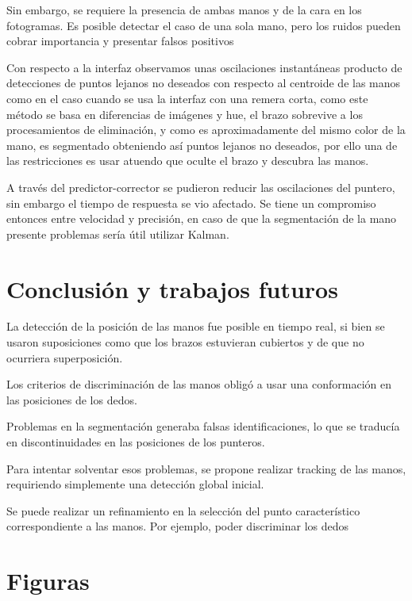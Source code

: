 \documentclass[conference,a4paper,10pt,oneside,final]{tfmpd}
\begin{document}
	Sin embargo, se requiere la presencia de ambas manos y de la cara en los fotogramas. Es posible detectar el caso de una sola mano, pero los ruidos pueden cobrar importancia y presentar falsos positivos

		Con respecto a la interfaz observamos unas oscilaciones instantáneas producto de detecciones de puntos lejanos no deseados con respecto al centroide de las manos como en el caso cuando se usa la interfaz con una remera corta, como este método se basa en diferencias de imágenes y hue, el brazo sobrevive a los procesamientos  de eliminación, y como es aproximadamente del mismo color de la mano, es segmentado obteniendo así puntos lejanos no deseados, por ello una de las restricciones es usar  atuendo que oculte el brazo y descubra las manos.

		A través del predictor-corrector se pudieron reducir las oscilaciones del puntero, 
	sin embargo el tiempo de respuesta se vio afectado. 
	Se tiene un compromiso entonces entre velocidad y precisión, en caso de que la segmentación de la mano
	presente problemas sería útil utilizar Kalman.

	\section{Conclusión y trabajos futuros}
		La detección de la posición de las manos fue posible en tiempo real,
		si bien se usaron suposiciones como que los brazos estuvieran cubiertos
		y de que no ocurriera superposición.

		Los criterios de discriminación de las manos obligó a 
		usar una conformación en las posiciones de los dedos. 

		Problemas en la segmentación generaba falsas identificaciones, 
		lo que se traducía en discontinuidades en las posiciones de los punteros.

		Para intentar solventar esos problemas, se propone realizar tracking
		de las manos, requiriendo simplemente una detección global inicial.

		Se puede realizar un refinamiento en la selección del punto característico
		correspondiente a las manos. Por ejemplo, poder discriminar los dedos
	\section{Figuras}
\end{document}

